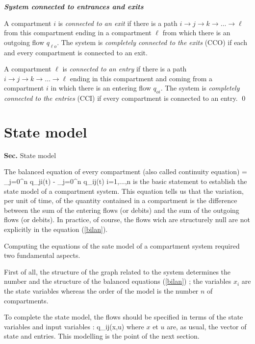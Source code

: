 \begin{definition}{\bf \em System connected to entrances and exits}

A compartment $i$ is {\it connected to an exit} if there is a path $i \rightarrow j \rightarrow k \rightarrow \dots \rightarrow \ell$ from this compartment ending in a compartment $\ell$ from which there is an outgoing flow  $q_{\ell o}$. The system is {\it completely connected to the exits} (CCO) if each and every compartment is connected to an exit.

A compartment $\ell$ is {\it connected to an entry} if there is a path $i \rightarrow j \rightarrow k \rightarrow \dots \rightarrow \ell$ ending in this compartment and coming from a compartment $i$ in which there is an entering flow $q_{oi}$. The system is {\it completely connected to the entries} (CCI) if every compartment is connected to an entry. \qed 
\end{definition}


\section{State model}
 {{ \bf Sec. \thesection} \hfill
State model \hspace*{5mm}}

The balanced equation of every compartment (also called continuity equation)
\eqnn
{} = \sum_{j=0}^n q_{ji}(t) - \sum_{j=0}^n q_{ij}(t) \hspace{1cm} i=1,...,n
\label{bilan}
\eeqnn
is the basic statement to establish the state model of a compartment system.
This equation tells us that the variation, per unit of time, of the 
quantity contained in a compartment is the difference between the 
sum of the entering flows (or debits) and the sum of the outgoing flows (or debits). 
In practice, of course, the flows wich are structurely null are not explicitly in the equation  
(\eqref{bilan}).

Computing the equations of the sate model of a compartment system required two 
fundamental aspects. 

First of all, the structure of the graph related to the system determines the 
number and the structure of the balanced equations (\eqref{bilan}) ; the variables $x_i$ are
the state variables whereas the order of the model is the number $n$ of  
compartments.

To complete the state model, the flows should be specified in terms of the 
state variables and input variables : 
\eqnn
q_{ij}(x,u)
\eeqnn
where $x$ et $u$ are, as usual, the vector of state and entries. 
This modelling is the point of the next section.

